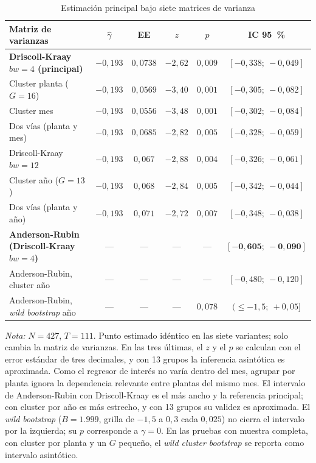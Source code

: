 \documentclass[11pt]{article}
\newcommand{\note}[2]{%
  \par\vspace{0.5ex}
  \begin{minipage}{#1}\footnotesize\textit{Nota:} #2\end{minipage}%
}
\begin{document}
\begin{table}[htbp]
  \caption{Estimación principal bajo siete matrices de varianza}\label{tab:vcov}
  \centering
  \begin{tabular}{@{} lccccc @{}}
    \toprule
    Matriz de varianzas & $\hat{\gamma}$ & EE & $z$ & $p$ & IC 95~\% \\
    \midrule
    \textbf{Driscoll-Kraay $bw=4$ (principal)} & $-0{,}193$ & $0{,}0738$ & $-2{,}62$ & $0{,}009$ & $[-0{,}338;\ -0{,}049]$ \\
    Cluster planta ($G=16$) & $-0{,}193$ & $0{,}0569$ & $-3{,}40$ & $0{,}001$ & $[-0{,}305;\ -0{,}082]$ \\
    Cluster mes            & $-0{,}193$ & $0{,}0556$ & $-3{,}48$ & $0{,}001$ & $[-0{,}302;\ -0{,}084]$ \\
    Dos vías (planta y mes) & $-0{,}193$ & $0{,}0685$ & $-2{,}82$ & $0{,}005$ & $[-0{,}328;\ -0{,}059]$ \\
    Driscoll-Kraay $bw=12$ & $-0{,}193$ & $0{,}067$ & $-2{,}88$ & $0{,}004$ & $[-0{,}326;\ -0{,}061]$ \\
    Cluster año ($G=13$) & $-0{,}193$ & $0{,}068$ & $-2{,}84$ & $0{,}005$ & $[-0{,}342;\ -0{,}044]$ \\
    Dos vías (planta y año) & $-0{,}193$ & $0{,}071$ & $-2{,}72$ & $0{,}007$ & $[-0{,}348;\ -0{,}038]$ \\
    \midrule
    \textbf{Anderson-Rubin (Driscoll-Kraay $bw=4$)} & --- & --- & --- & --- & $\mathbf{[-0{,}605;\ -0{,}090]}$ \\
    Anderson-Rubin, cluster año & --- & --- & --- & --- & $[-0{,}480;\ -0{,}120]$ \\
    Anderson-Rubin, \textit{wild bootstrap} año & --- & --- & --- & $0{,}078$ & $(\leq -1{,}5;\ +0{,}05]$ \\
    \bottomrule
  \end{tabular}
  \note{0.9\textwidth}{$N=427$, $T=111$. Punto estimado idéntico en las siete variantes; solo cambia la matriz de varianzas. En las tres últimas, el $z$ y el $p$ se calculan con el error estándar de tres decimales, y con 13 grupos la inferencia asintótica es aproximada. Como el regresor de interés no varía dentro del mes, agrupar por planta ignora la dependencia relevante entre plantas del mismo mes. El intervalo de Anderson-Rubin con Driscoll-Kraay es el más ancho y la referencia principal; con cluster por año es más estrecho, y con 13 grupos su validez es aproximada. El \textit{wild bootstrap} ($B=1.999$, grilla de $-1{,}5$ a $0{,}3$ cada $0{,}025$) no cierra el intervalo por la izquierda; su $p$ corresponde a $\gamma=0$. En las pruebas con muestra completa, con cluster por planta y un $G$ pequeño, el \textit{wild cluster bootstrap} se reporta como intervalo asintótico.}
\end{table}
\end{document}
